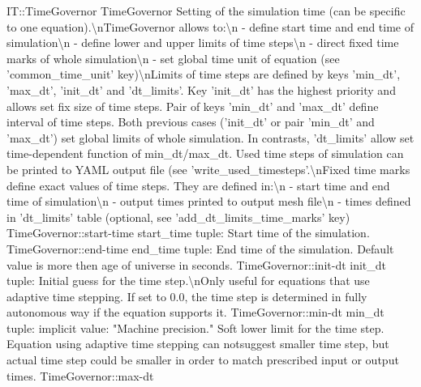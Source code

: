 \begin{RecordType}
	{IT::TimeGovernor}
	{TimeGovernor}
	{}%
	{}%
	{{{Setting of the simulation time (can be specific to one equation).{\textbackslash}nTimeGovernor allows to:{\textbackslash}n - define start time and end time of simulation{\textbackslash}n - define lower and upper limits of time steps{\textbackslash}n - direct fixed time marks of whole simulation{\textbackslash}n - set global time unit of equation (see 'common{\_}time{\_}unit' key){\textbackslash}nLimits of time steps are defined by keys 'min{\_}dt', 'max{\_}dt', 'init{\_}dt' and 'dt{\_}limits'. Key 'init{\_}dt' has the highest priority and allows set fix size of time steps.
Pair of keys 'min{\_}dt' and 'max{\_}dt' define interval of time steps.
Both previous cases ('init{\_}dt' or pair 'min{\_}dt' and 'max{\_}dt') set global limits of whole simulation.
In contrasts, 'dt{\_}limits' allow set time-dependent function of min{\_}dt/max{\_}dt.
Used time steps of simulation can be printed to YAML output file (see 'write{\_}used{\_}timesteps'.{\textbackslash}nFixed time marks define exact values of time steps.
They are defined in:{\textbackslash}n - start time and end time of simulation{\textbackslash}n - output times printed to output mesh file{\textbackslash}n - times defined in 'dt{\_}limits' table (optional, see 'add{\_}dt{\_}limits{\_}time{\_}marks' key)}%
}}
		\RecKey
			{TimeGovernor::start-time}
			{start{\_}time}
			{{tuple: }}{}
			{ }
			{{{Start time of the simulation.}%
}}
		\RecKey
			{TimeGovernor::end-time}
			{end{\_}time}
			{{tuple: }}{}
			{ }
			{{{End time of the simulation.
Default value is more then age of universe in seconds.}%
}}
		\RecKey
			{TimeGovernor::init-dt}
			{init{\_}dt}
			{{tuple: }}{}
			{ }
			{{{Initial guess for the time step.{\textbackslash}nOnly useful for equations that use adaptive time stepping.
If set to 0.0, the time step is determined in fully autonomous way if the equation supports it.}%
}}
		\RecKey
			{TimeGovernor::min-dt}
			{min{\_}dt}
			{{tuple: }}{}
			{implicit value: "{Machine precision.}"}
			{{{Soft lower limit for the time step.
Equation using adaptive time stepping can notsuggest smaller time step, but actual time step could be smaller in order to match prescribed input or output times.}%
}}
		\RecKey
			{TimeGovernor::max-dt}

\end{RecordType}
